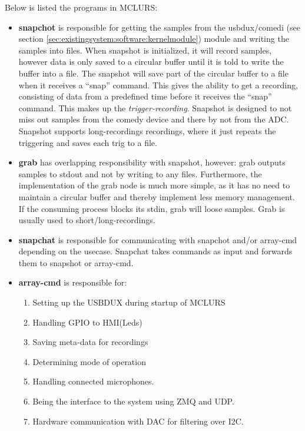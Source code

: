 Below is listed the programs in MCLURS:
\begin{itemize}
	\item \textbf{snapchot} is responsible for getting the samples from the usbdux/comedi (see section \ref{sec:existingsystem:software:kernelmodule}) module and writing the samples into files. When snapshot is initialized, it will record samples, however data is only saved to a circular buffer until it is told to write the buffer into a file. The snapshot will save part of the circular buffer to a file when it receives a “snap” command. This gives the ability to get a recording, consisting of data from a predefined time before it receives the “snap” command. This makes up the \textit{trigger-recording}. Snapshot is designed to not miss out samples from the comedy device and there by not from the ADC. Snapshot supports long-recordings recordings, where it just repeats the triggering and saves each trig to a file.
	
	\item \textbf{grab} has overlapping responsibility with snapshot, however: grab outputs samples to stdout and not by writing to any files. Furthermore, the implementation of the grab node is much more simple, as it has no need to maintain a circular buffer and thereby implement less memory management. If the consuming process blocks its stdin, grab will loose samples. Grab is usually used to short/long-recordings.

	\item \textbf{snapchat} is responsible for communicating with snapchot and/or array-cmd depending on the usecase. Snapchat takes commands as input and forwards them to snapshot or array-cmd.

	\item \textbf{array-cmd} is responsible for:
	\begin{enumerate}	
		\item Setting up the USBDUX during startup of MCLURS 
		\item Handling GPIO to HMI(Leds)
		\item Saving meta-data for recordings
		\item Determining mode of operation
		\item Handling connected microphones.
		\item Being the interface to the system using ZMQ and UDP.
		\item Hardware communication with DAC for filtering over I2C.
	\end{enumerate} 


\end{itemize}
